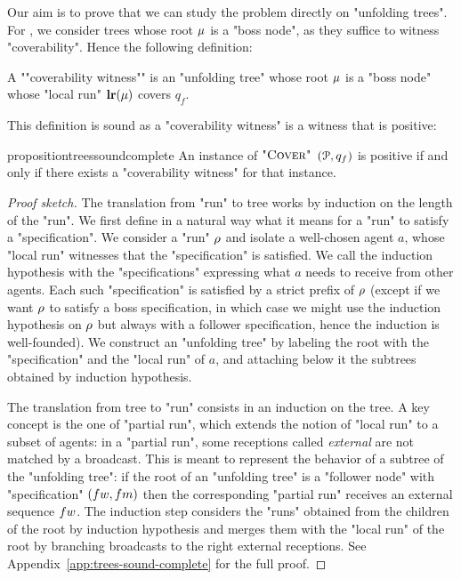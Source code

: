 Our aim is to prove that we can study the \COVER problem directly on "unfolding trees". For \COVER, we consider trees whose root $\mu$ is a "boss node", as they suffice to witness "coverability". 
Hence the following definition: 

\begin{definition}
\label{def:cov_witness}
A ""coverability witness"" is an "unfolding tree" whose root $\mu$ is a "boss node" whose "local run" $\mathbf{lr}(\mu)$ covers $q_f$. 
\end{definition}

This definition is sound as a "coverability witness" is a witness that \COVER is positive:

\begin{restatable}{proposition}{treessoundcomplete}
\label{prop:trees-sound-complete}
An instance of $\textsc{"Cover"}$ $(\mathcal{P},q_f)$ is positive if and only if there exists a "coverability witness" for that instance.
\end{restatable}
\begin{proof}[Proof sketch]
The translation from "run" to tree works by induction on the length of the "run". We first define in a natural way what it means for a "run" to satisfy a "specification". We consider a "run" $\rho$ and isolate a well-chosen agent $a$, whose "local run" witnesses that the "specification" is satisfied. We call the induction hypothesis with the "specifications" expressing what $a$ needs to receive from other agents. Each such "specification" is satisfied by a strict prefix of $\rho$ (except if we want $\rho$ to satisfy a boss specification, in which case we might use the induction hypothesis on $\rho$ but always with a follower specification, hence the induction is well-founded).
We construct an "unfolding tree" by labeling the root with the "specification" and the "local run" of $a$, and attaching below it the subtrees obtained by induction hypothesis.

The translation from tree to "run" consists in an induction on the tree. A key concept is the one of "partial run", which extends the notion of "local run" to a subset of agents: in a "partial run", some receptions called \emph{external} are not matched by a broadcast. This is meant to represent the behavior of a subtree of the "unfolding tree": if the root of an "unfolding tree" is a "follower node" with "specification" $(\followwordspec, \followmessagespec)$ then the corresponding "partial run" receives an external sequence $\followwordspec$. The induction step considers the "runs" obtained from the children of the root by induction hypothesis and merges them with the "local run" of the root by branching broadcasts to the right external receptions. 
See Appendix~\ref{app:trees-sound-complete} for the full proof. 
\end{proof}



